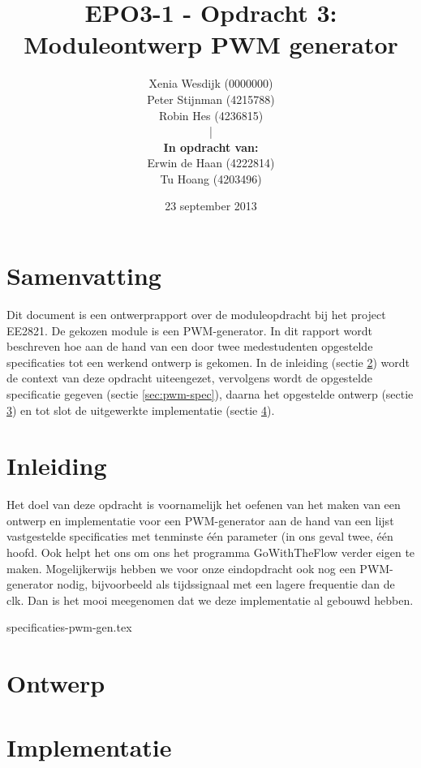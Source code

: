 \documentclass{article}
\author{
Xenia Wesdijk (0000000) \\
Peter Stijnman (4215788) \\
Robin Hes (4236815) \\
|\\
\textbf{In opdracht van:} \\
Erwin de Haan (4222814) \\
Tu Hoang (4203496) \\
}
\title{EPO3-1 - Opdracht 3: Moduleontwerp PWM generator}
\date{23 september 2013}
\begin{document}
\maketitle
\section{Samenvatting}
Dit document is een ontwerprapport over de moduleopdracht bij het project EE2821. De gekozen module is een PWM-generator.
In dit rapport wordt beschreven hoe aan de hand van een door twee medestudenten opgestelde specificaties tot een werkend ontwerp is gekomen.
In de inleiding (sectie \ref{sec:pwm-inl}) wordt de context van deze opdracht uiteengezet, vervolgens wordt de opgestelde specificatie gegeven (sectie \ref{sec:pwm-spec}), daarna het opgestelde ontwerp (sectie \ref{sec:pwm-ontw}) en tot slot de uitgewerkte implementatie (sectie \ref{sec:pwm-impl}).

\tableofcontents
\section{Inleiding}
\label{sec:pwm-inl}
Het doel van deze opdracht is voornamelijk het oefenen van het maken van een ontwerp en implementatie voor een PWM-generator aan de hand van een lijst vastgestelde specificaties met tenminste één parameter (in ons geval twee, één hoofd. Ook helpt het ons om ons het programma GoWithTheFlow verder eigen te maken.
Mogelijkerwijs hebben we voor onze eindopdracht ook nog een PWM-generator nodig, bijvoorbeeld als tijdssignaal met een lagere frequentie dan de clk. Dan is het mooi meegenomen dat we deze implementatie al gebouwd hebben.

\label{sec:pwm-spec}
{specificaties-pwm-gen.tex}

\section{Ontwerp}
\label{sec:pwm-ontw}
\section{Implementatie}
\label{sec:pwm-impl}
\end{document}

